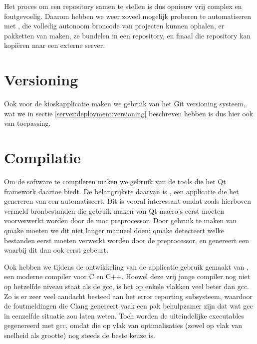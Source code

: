 
Het proces om een repository samen te stellen is dus opnieuw vrij complex en foutgevoelig. Daarom hebben we weer zoveel mogelijk proberen te automatiseren met , die volledig autonoom broncode van projecten kunnen ophalen, er pakketten van maken, ze bundelen in een repository, en finaal die repository kan kopiëren naar een externe server.

\section{Versioning}
\label{kiosk:deployment:versioning}

Ook voor de kioskapplicatie maken we gebruik van het Git versioning systeem, wat we in sectie \ref{server:deployment:versioning} beschreven hebben is dus hier ook van toepassing.

\section{Compilatie}
\label{kiosk:deployment:compilatie}

Om de software te compileren maken we gebruik van de tools die het Qt framework daartoe biedt. De belangrijkste daarvan is , een applicatie die het genereren van een  automatiseert. Dit is vooral interessant omdat zoals hierboven vermeld bronbestanden die gebruik maken van Qt-macro's eerst moeten voorverwerkt worden door de \ac{moc} preprocessor. Door gebruik te maken van qmake moeten we dit niet langer manueel doen: qmake detecteert welke bestanden eerst moeten verwerkt worden door de preprocessor, en genereert een  waarbij dit dan ook eerst gebeurt.

Ook hebben we tijdens de ontwikkeling van de applicatie gebruik gemaakt van , een moderne compiler voor C en C++. Hoewel deze vrij jonge compiler nog niet op hetzelfde niveau staat als de \ac{gcc}, is het op enkele vlakken veel beter dan \ac{gcc}. Zo is er zeer veel aandacht besteed aan het error reporting subsysteem, waardoor de foutmeldingen die Clang genereert vaak een pak behulpzamer zijn dat wat \ac{gcc} in eenzelfde situatie zou laten weten. Toch worden de uiteindelijke executables gegenereerd met \ac{gcc}, omdat die op vlak van optimalisaties (zowel op vlak van snelheid als grootte) nog steeds de beste keuze is.

